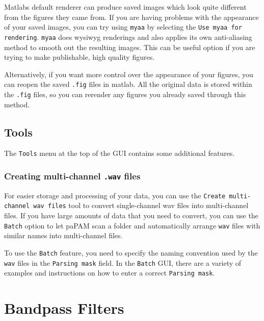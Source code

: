 \documentclass[11pt]{report}
\begin{document}
Matlabs default renderer can produce saved images which look quite different from the figures they came from.  If you are having problems with the appearance of your saved images, you can try using \texttt{myaa} by selecting the \texttt{Use myaa for rendering}.  \texttt{myaa} does wysiwyg renderings and also applies its own anti-aliasing method to smooth out the resulting images.  This can be useful option if you are trying to make publishable, high quality figures.

Alternatively, if you want more control over the appearance of your figures, you can reopen the saved \texttt{.fig} files in matlab.  All the original data is stored within the \texttt{.fig} files, so you can rerender any figures you already saved through this method.

\subsection{Tools}

The \texttt{Tools} menu at the top of the GUI contains some additional features.

\subsubsection{Creating multi-channel \texttt{.wav} files} \label{CreatingMultiChannelWavFiles}


For easier storage and processing of your data, you can use the \texttt{Create multi-channel wav files} tool to convert single-channel wav files into multi-channel files.
If you have large amounts of data that you need to convert, you can use the \texttt{Batch} option to let paPAM scan a folder and automatically arrange \texttt{wav} files with similar names into multi-channel files.

To use the \texttt{Batch} feature, you need to specify the naming convention used by the \texttt{wav} files in the \texttt{Parsing mask} field.  In the \texttt{Batch} GUI, there are a variety of examples and instructions on how to enter a correct \texttt{Parsing mask}.

\section{Bandpass Filters} \label{BandpassFilters}
\end{document}
